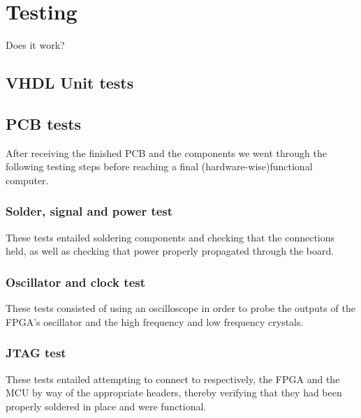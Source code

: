 \chapter{Testing}

Does it work?

\section{VHDL Unit tests}




\section{PCB tests}

After receiving the finished PCB and the components we went through the following testing steps before reaching a final (hardware-wise)functional computer.   

\subsection{Solder, signal and power test}
These tests entailed soldering components and checking that the connections held, as well as checking that power properly propagated through the board.  


\subsection{Oscillator and clock test}
These tests consisted of using an oscilloscope in order to probe the outputs of the FPGA's oscillator and the high frequency and low frequency crystals.


\subsection{JTAG test}
These tests entailed attempting to connect to respectively, the FPGA and the MCU by way of the appropriate headers, thereby verifying that they had been properly soldered in place and were functional.

